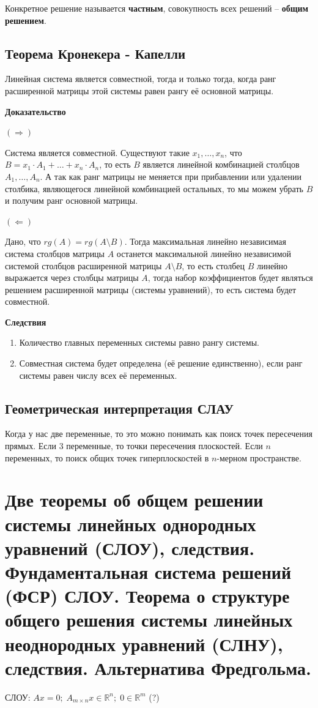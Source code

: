 \documentclass{article}
\newcommand{\R}{\mathbb R}
\begin{document}
Конкретное решение называется \textbf{частным}, совокупность всех решений -- \textbf{общим решением}.
\newpage
\subsection{Теорема Кронекера - Капелли}
Линейная система является совместной, тогда и только тогда, когда ранг расширенной матрицы этой системы равен рангу её основной матрицы.

\textbf{Доказательство}

$(\Rightarrow)$

Система является совместной. Существуют такие $x_1,\ldots,x_n$, что $B=x_1\cdot A_1+\ldots+x_n\cdot A_n$, то есть $B$ является линейной комбинацией столбцов $A_1,\ldots,A_n$. А так как ранг матрицы не меняется при прибавлении или удалении столбика, являющегося линейной комбинацией остальных, то мы можем убрать $B$ и получим ранг основной матрицы.

$(\Leftarrow)$

Дано, что $rg(A)=rg(A\setminus B)$. Тогда максимальная линейно независимая система столбцов матрицы $A$ останется максимальной линейно независимой системой столбцов расширенной матрицы $A\setminus B$, то есть столбец $B$ линейно выражается через столбцы матрицы $A$, тогда набор коэффициентов будет являться решением расширенной матрицы (системы уравнений), то есть система будет совместной.

\textbf{Следствия}

\begin{enumerate}
    \item Количество главных переменных системы равно рангу системы.
    \item Совместная система будет определена (её решение единственно), если ранг системы равен числу всех её переменных.
\end{enumerate}

\subsection{Геометрическая интерпретация СЛАУ}
Когда у нас две переменные, то это можно понимать как поиск точек пересечения прямых. Если $3$ переменные, то точки пересечения плоскостей. Если $n$ переменных, то поиск общих точек гиперплоскостей в $n$-мерном пространстве.

\newpage
\section{Две теоремы об общем решении системы линейных однородных уравнений (СЛОУ), следствия. Фундаментальная система решений (ФСР) СЛОУ. Теорема о структуре общего решения системы линейных неоднородных уравнений (СЛНУ), следствия. Альтернатива Фредгольма.}
СЛОУ: $Ax=0;\;A_{m\times n}x\in \R^n;\;0\in \R^m$ (?)
\end{document}
